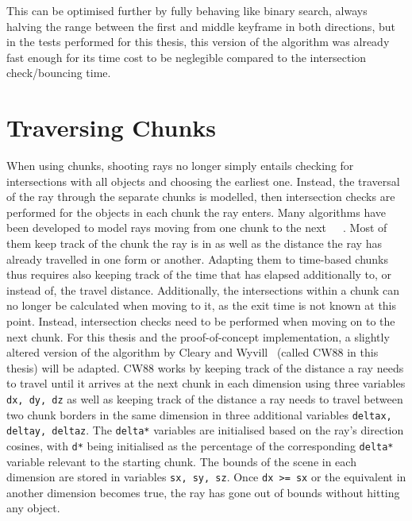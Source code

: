 This can be optimised further by fully behaving like binary search,
always halving the range between the first and middle keyframe in both directions,
but in the tests performed for this thesis,
this version of the algorithm was already fast enough for its time cost to be neglegible
compared to the intersection check/bouncing time.

\section{Traversing Chunks}\label{sec:TraversingChunks}

When using chunks, shooting rays no longer simply entails checking for intersections with all objects and choosing the earliest one.
Instead, the traversal of the ray through the separate chunks is modelled,
then intersection checks are performed for the objects in each chunk the ray enters.
\newline
Many algorithms have been developed to model rays moving from one chunk to the next~\cite{CW88}~\cite{FI85}~\cite{HT92}.
Most of them keep track of the chunk the ray is in as well as the distance the ray has already travelled in one form or another.
Adapting them to time-based chunks thus requires also keeping track of the time that has elapsed additionally to,
or instead of, the travel distance.
Additionally, the intersections within a chunk can no longer be calculated when moving to it,
as the exit time is not known at this point.
Instead, intersection checks need to be performed when moving on to the next chunk.
\newline
For this thesis and the proof-of-concept implementation,
a slightly altered version of the algorithm by Cleary and Wyvill~\cite{CW88} (called CW88 in this thesis) will be adapted.
\newline
CW88 works by keeping track of the distance a ray needs to travel until it arrives at the next chunk in each dimension
using three variables \verb|dx, dy, dz|
as well as keeping track of the distance a ray needs to travel between two chunk borders in the same dimension
in three additional variables \verb|deltax, deltay, deltaz|.
The \verb|delta*| variables are initialised based on the ray's direction cosines,
with \verb|d*| being initialised as the percentage of the corresponding \verb|delta*| variable relevant to the starting chunk.
The bounds of the scene in each dimension are stored in variables \verb|sx, sy, sz|.
Once \verb|dx >= sx| or the equivalent in another dimension becomes true,
the ray has gone out of bounds without hitting any object.
